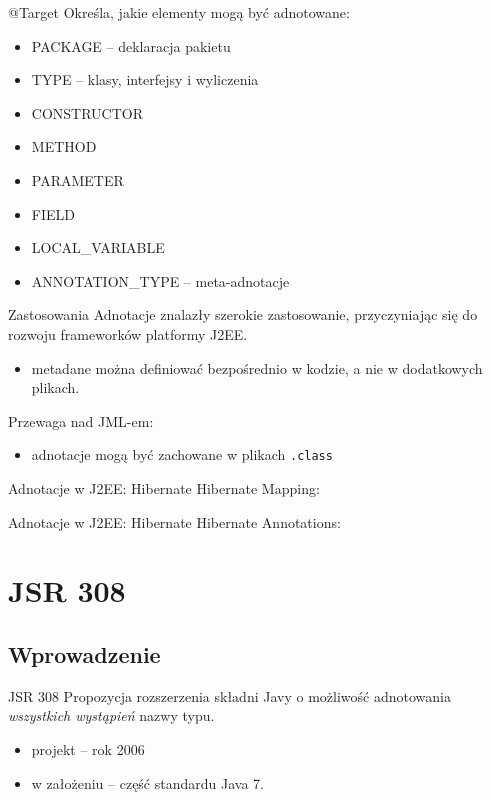 \documentclass{beamer}
\begin{document}
\begin{frame}{@Target}
Określa, jakie elementy mogą być adnotowane:
\begin{itemize}[ANNOTATION\_TYPE]
\item<1-> PACKAGE -- deklaracja pakietu
\item<2-> TYPE -- klasy, interfejsy i wyliczenia
\item<3-> CONSTRUCTOR $\quad$
\item<3-> METHOD $\quad$
\item<4-> PARAMETER $\quad$
\item<4-> FIELD $\quad$
\item<4-> LOCAL\_VARIABLE $\quad$
\item<5-> ANNOTATION\_TYPE -- meta-adnotacje
\end{itemize}
\end{frame}

\begin{frame}{Zastosowania}
Adnotacje znalazły szerokie zastosowanie, przyczyniając się 
do rozwoju frameworków platformy J2EE.
\begin{itemize}
\item metadane można definiować bezpośrednio w kodzie, 
  a nie w dodatkowych plikach.
\end{itemize}
\pause
Przewaga nad JML-em: 
\begin{itemize}
\item adnotacje mogą być zachowane w plikach \texttt{.class}
\end{itemize}
\end{frame}

\begin{frame}{Adnotacje w J2EE: Hibernate}
  Hibernate Mapping:
  
\end{frame}

\begin{frame}{Adnotacje w J2EE: Hibernate}
  Hibernate Annotations:
  
\end{frame}

\section{JSR 308}
\subsection{Wprowadzenie}
\begin{frame}{JSR 308}
Propozycja rozszerzenia składni Javy o możliwość adnotowania
\emph{wszystkich wystąpień} nazwy typu.
\pause
\begin{itemize}
\item projekt -- rok 2006
\item w założeniu -- część standardu Java 7.
\end{itemize}
\end{frame}
\end{document}
